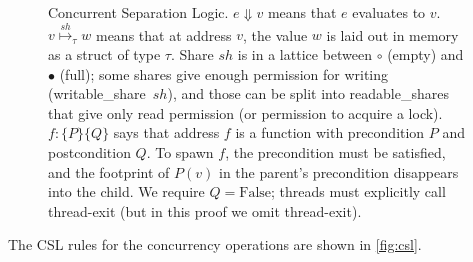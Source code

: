 \begin{figure}

\begin{minipage}{3.5in}





\vspace{1ex}


\end{minipage}\begin{minipage}{2.5in}
\caption[Concurrent Separation Logic]{Concurrent Separation Logic. %
\newline
  $e\Downarrow v$ means that $e$ evaluates to $v$. \newline
  $v \stackrel{\mathit{sh}}\mapsto_\tau w$ means that
  at address $v$, the value $w$ is laid out in memory as a \textsf{struct} of type $\tau$.
  Share
  $\mathit{sh}$ is in a lattice between $\circ$ (empty) and $\bullet$ (full);
  some shares give enough permission for
  writing (writable\_share~$\mathit{sh}$),
  and those can be split into readable\_shares that give only read permission
  (or permission to acquire a lock).
  $  f\!:\! \{P\}\{Q\}$ says that address $f$ is a
  function with precondition $P$ and postcondition $Q$.  To spawn $f$,
  the precondition must be satisfied, and the footprint
  of $P(v)$ in the parent's precondition disappears into the child.
  We require $Q=\mathrm{False}$; threads must explicitly call
  thread-exit (but in this proof we omit thread-exit).
}
\label{fig:csl}
\end{minipage}
\vspace{-1ex}
  \end{figure}
\noindent
The CSL rules for the concurrency operations are shown in
\autoref{fig:csl}.

